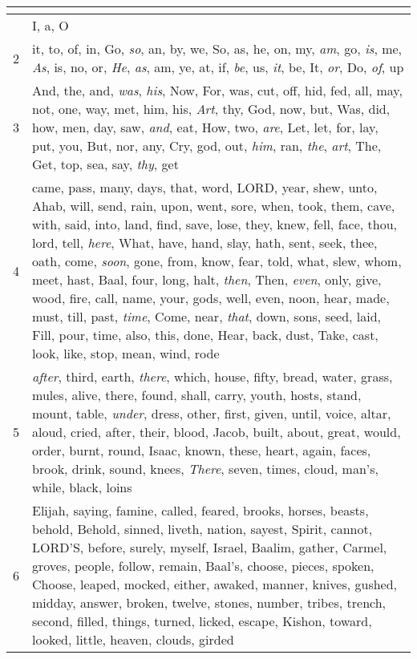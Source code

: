 \begin{center}
\begin{longtable}{l|p{3.75in}}
\hline \multicolumn{2}{c}{{ }} \\ \hline
\endfoot 
1 & I, a, O\\ \hline 
2 & it, to, of, in, Go, \emph{so}, an, by, we, So, as, he, on, my, \emph{am}, go, \emph{is}, me, \emph{As}, is, no, or, \emph{He}, \emph{as}, am, ye, at, if, \emph{be}, us, \emph{it}, be, It, \emph{or}, Do, \emph{of}, up\\ \hline 
3 & And, the, and, \emph{was}, \emph{his}, Now, For, was, cut, off, hid, fed, all, may, not, one, way, met, him, his, \emph{Art}, thy, God, now, but, Was, did, how, men, day, saw, \emph{and}, eat, How, two, \emph{are}, Let, let, for, lay, put, you, But, nor, any, Cry, god, out, \emph{him}, ran, \emph{the}, \emph{art}, The, Get, top, sea, say, \emph{thy}, get\\ \hline 
4 & came, pass, many, days, that, word, LORD, year, shew, unto, Ahab, will, send, rain, upon, went, sore, when, took, them, cave, with, said, into, land, find, save, lose, they, knew, fell, face, thou, lord, tell, \emph{here}, What, have, hand, slay, hath, sent, seek, thee, oath, come, \emph{soon}, gone, from, know, fear, told, what, slew, whom, meet, hast, Baal, four, long, halt, \emph{then}, Then, \emph{even}, only, give, wood, fire, call, name, your, gods, well, even, noon, hear, made, must, till, past, \emph{time}, Come, near, \emph{that}, down, sons, seed, laid, Fill, pour, time, also, this, done, Hear, back, dust, Take, cast, look, like, stop, mean, wind, rode\\ \hline 
5 & \emph{after}, third, earth, \emph{there}, which, house, fifty, bread, water, grass, mules, alive, there, found, shall, carry, youth, hosts, stand, mount, table, \emph{under}, dress, other, first, given, until, voice, altar, aloud, cried, after, their, blood, Jacob, built, about, great, would, order, burnt, round, Isaac, known, these, heart, again, faces, brook, drink, sound, knees, \emph{There}, seven, times, cloud, man's, while, black, loins\\ \hline 
6 & Elijah, saying, famine, called, feared, brooks, horses, beasts, behold, Behold, sinned, liveth, nation, sayest, Spirit, cannot, LORD'S, before, surely, myself, Israel, Baalim, gather, Carmel, groves, people, follow, remain, Baal's, choose, pieces, spoken, Choose, leaped, mocked, either, awaked, manner, knives, gushed, midday, answer, broken, twelve, stones, number, tribes, trench, second, filled, things, turned, licked, escape, Kishon, toward, looked, little, heaven, clouds, girded\\ \hline 

\end{longtable}
\end{center}
